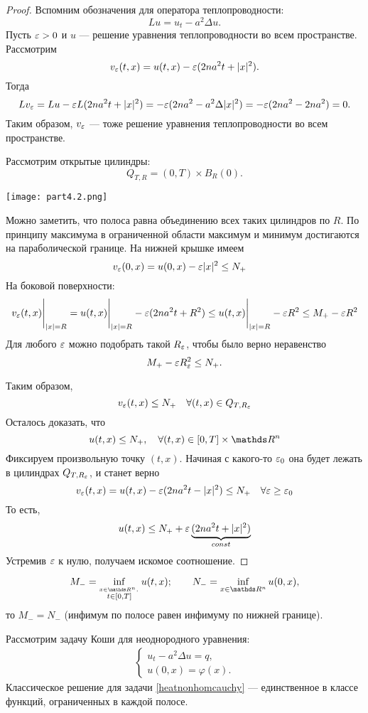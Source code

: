 \begin{proof}
Вспомним обозначения для оператора теплопроводности:
$$ Lu = u_t - a^2 \Delta u.$$
Пусть $\varepsilon >0 $ и $u$ --- решение уравнения теплопроводности во всем пространстве. Рассмотрим
$$v_\varepsilon(t, x) = u(t, x) - \varepsilon(2na^2t + \lvert x\rvert^2).$$
Тогда
$$Lv_\varepsilon = Lu - \varepsilon L(2na^2t + \lvert x\rvert^2) = -\varepsilon(2na^2 - a^2\Delta\lvert x\rvert^2) = -\varepsilon(2na^2 - 2na^2) = 0.$$
Таким образом, $v_\varepsilon$ --- тоже решение уравнения теплопроводности во всем пространстве.

Рассмотрим открытые цилиндры: $$Q_{T,R} = (0,T)\times B_R(0).$$

\begin{center}
\texttt{[image: part4.2.png]}
\end{center}

Можно заметить, что полоса равна объединению всех таких цилиндров по $R$. По принципу максимума в ограниченной области максимум и минимум достигаются на параболической границе. На нижней крышке имеем
$$ v_\varepsilon (0,x) = u(0,x) - \varepsilon |x|^2 \leq N_+ \quad$$
На боковой поверхности:
$$v_\varepsilon(t,x)\Bigg\rvert_{\lvert x\rvert = R} = u(t,x) \Bigg\rvert_{\lvert x\rvert = R} - \varepsilon(2na^2t + R^2) \leq u(t,x)\Bigg\rvert_{\lvert x\rvert = R} - \varepsilon R^2 \leq M_+ - \varepsilon R^2$$
Для любого $\varepsilon$ можно подобрать такой $R_\varepsilon$, чтобы было верно неравенство $$ M_+ - \varepsilon R^2_\varepsilon \leq N_+.$$

Таким образом,
$$ v_\varepsilon (t, x) \leq N_+ \quad \forall (t,x) \in {Q_{T, R_\varepsilon}}$$
Осталось доказать, что
$$u(t,x) \leq N_+, \quad \forall (t,x) \in [0, T] \times \real^n$$
Фиксируем произвольную точку $(t,x)$. Начиная с какого-то $\varepsilon_0$ она будет лежать в цилиндрах $Q_{T, R_\varepsilon}$, и станет верно
$$v_\varepsilon(t,x) = u(t,x) - \varepsilon(2na^2t - \lvert x\rvert^2) \leq N_+ \quad \forall \varepsilon \geq \varepsilon_0$$
То есть,
$$u(t,x) \leq N_+ + \varepsilon \underbrace{(2na^2t + |x|^2)}_{const}$$
Устремив $\varepsilon$ к нулю, получаем искомое соотношение.

\end{proof}

\begin{corollary}
$$M_- = \inf_{\stackrel{x \in \real^n, \,} {t \in [0, T]}}u(t,x); \qquad N_- = \inf_{x \in \real^n}u(0,x),$$
то $M_-=N_-$ (инфимум по полосе равен инфимуму по нижней границе).
\end{corollary}

\begin{corollary}[Единственность]
Рассмотрим задачу Коши для неоднородного уравнения:
\begin{align}
    \begin{cases} 
        u_t - a^2 \Delta u = q, \\
        u (0, x) = \varphi (x).
    \end{cases}
\label{heatnonhomcauchy}
\end{align}
Классическое решение для задачи \eqref{heatnonhomcauchy} --- единственное в классе функций, ограниченных в каждой полосе.
\end{corollary}

